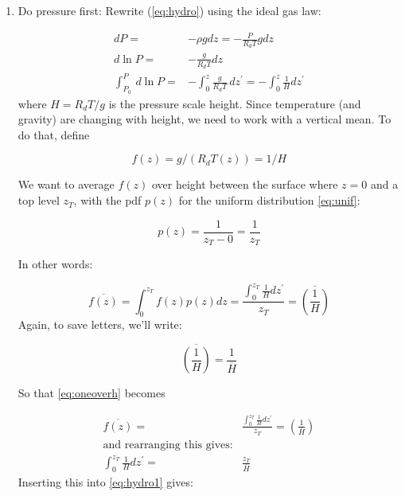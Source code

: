 \documentclass[12pt]{article}
\begin{document}
\begin{enumerate}
\item Do pressure first: Rewrite (\ref{eq:hydro}) using the ideal gas law:

  \begin{subequations}
  \begin{align}
  dP =& - \rho g dz = - \frac{P}{R_d T}  g dz \label{eq:one}\\
  d\ln P =& - \frac{g }{R_d T} dz \label{eq:two}\\
  \int_{P_0}^{P}\!\,d \ln P =& - \int_{0 }^{z}\!\frac{g }{R_d T} \,dz^\prime = - \int_{0 }^{z}\!\frac{1}{H} dz^\prime \label{eq:hydro1}
  \end{align}
\end{subequations}
where $H=R_d T/g$ is the pressure scale height.  Since temperature (and gravity) are changing with height,
we need to work with a vertical mean. To do that, define 

\begin{equation}
  f(z) = g/(R_d T(z)) = 1/H
\end{equation}

We want to average $f(z)$ over height between the surface
where $z=0$ and a top level $z_T$, with the pdf $p(z)$ for the uniform distribution \eqref{eq:unif}:

\begin{equation}
  \label{eq:uniz}
  p(z) = \frac{1}{z_T - 0} = \frac{1}{z_T}
\end{equation}

In other words:

\begin{equation}
  \label{eq:oneoverh}
  \overline{f(z)} = \int_0^{z_T} f(z) p(z) dz = \frac{\int_{0 }^{z_T}\!\frac{1}{H} dz^\prime  }{z_T} = \overline{ \left ( \frac{1 }{H} \right )}
\end{equation}
Again, to save letters, we'll write:

\begin{equation}
  \label{eq:simple}
  \overline{ \left ( \frac{1 }{H} \right )} = \frac{1}{\overline{H}}
\end{equation}

So that \eqref{eq:oneoverh} becomes

\begin{subequations}
  \begin{align}
  \label{eq:oneoverh2}
  \overline{f(z)} =&  \frac{\int_{0 }^{z_T}\!\frac{1}{H} dz^\prime  }{z_T} = \left ( \frac{1 }{\overline{H}} \right )\\
\text{and rearranging this gives:} \nonumber\\
\int_{0 }^{z_T}\!\frac{1}{H} dz^\prime =& \frac{z_T}{\overline{H}}
\end{align}
\end{subequations}
Inserting this into \eqref{eq:hydro1} gives:



\end{enumerate}
\end{document}
